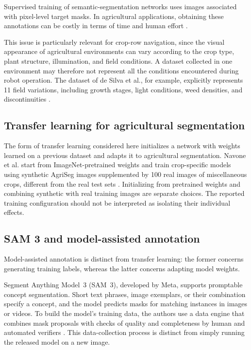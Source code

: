 Supervised training of semantic-segmentation networks uses images associated
with pixel-level target masks. In agricultural applications, obtaining
these annotations can be costly in terms of time and human effort
\cite{navone2025gpsfree}.

This issue is particularly relevant for crop-row navigation, since the
visual appearance of agricultural environments can vary according to the
crop type, plant structure, illumination, and field conditions. A dataset
collected in one environment may therefore not represent all the
conditions encountered during robot operation. The dataset of de Silva
et al., for example, explicitly represents 11 field variations, including
growth stages, light conditions, weed densities, and discontinuities
\cite[Section~3]{silva2023rowdetection}.

\subsection{Transfer learning for agricultural segmentation}
\label{subsec:transfer_learning}

The form of transfer learning considered here initializes a network with
weights learned on a previous dataset and adapts it to agricultural
segmentation. Navone et al. start from ImageNet-pretrained weights and
train crop-specific models using synthetic AgriSeg images supplemented
by 100 real images of miscellaneous crops, different from the real test
sets \cite[Section~4.1, Table~1]{navone2025gpsfree}.
Initializing from pretrained weights and combining synthetic with real
training images are separate choices. The reported training configuration
should not be interpreted as isolating their individual effects.

\subsection{SAM 3 and model-assisted annotation}
\label{subsec:auto_labeling}

Model-assisted annotation is distinct from transfer learning: the former
concerns generating training labels, whereas the latter concerns adapting
model weights.

Segment Anything Model~3 (SAM~3), developed by Meta, supports
promptable concept segmentation. Short text phrases, image exemplars, or their
combination specify a concept, and the model predicts masks for matching
instances in images or videos. To build the model's training data, the
authors use a data engine that combines mask proposals with checks of
quality and completeness by human and automated verifiers
\cite[Sections~2 and~4]{carion2026sam3}. This data-collection process is
distinct from simply running the released model on a new image.

